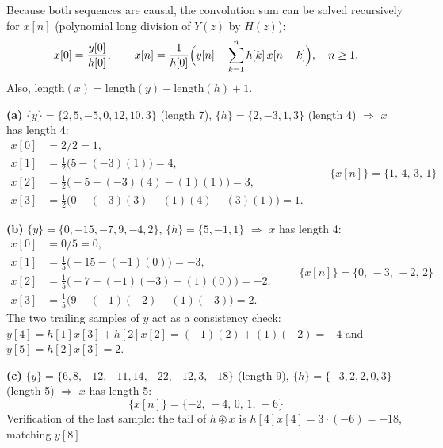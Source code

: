 
Because both sequences are causal, the convolution sum can be solved recursively for
$x[n]$ (polynomial long division of $Y(z)$ by $H(z)$):
\[
x[0]=\frac{y[0]}{h[0]},\qquad
x[n]=\frac{1}{h[0]}\Bigl(y[n]-\sum_{k=1}^{n}h[k]\,x[n-k]\Bigr),\quad n\ge 1 .
\]
Also, $\text{length}(x)=\text{length}(y)-\text{length}(h)+1$.

\textbf{(a)} $\{y\}=\{2,5,-5,0,12,10,3\}$ (length 7), $\{h\}=\{2,-3,1,3\}$ (length 4)
$\Rightarrow$ $x$ has length 4:
\[
\begin{aligned}
x[0]&=2/2=1,\\
x[1]&=\tfrac12\bigl(5-(-3)(1)\bigr)=4,\\
x[2]&=\tfrac12\bigl(-5-(-3)(4)-(1)(1)\bigr)=3,\\
x[3]&=\tfrac12\bigl(0-(-3)(3)-(1)(4)-(3)(1)\bigr)=1 .
\end{aligned}
\qquad
\boxed{\{x[n]\}=\{1,\,4,\,3,\,1\}}
\]

\textbf{(b)} $\{y\}=\{0,-15,-7,9,-4,2\}$, $\{h\}=\{5,-1,1\}$ $\Rightarrow$ $x$ has length 4:
\[
\begin{aligned}
x[0]&=0/5=0,\\
x[1]&=\tfrac15\bigl(-15-(-1)(0)\bigr)=-3,\\
x[2]&=\tfrac15\bigl(-7-(-1)(-3)-(1)(0)\bigr)=-2,\\
x[3]&=\tfrac15\bigl(9-(-1)(-2)-(1)(-3)\bigr)=2 .
\end{aligned}
\qquad
\boxed{\{x[n]\}=\{0,\,-3,\,-2,\,2\}}
\]
The two trailing samples of $y$ act as a consistency check:
$y[4]=h[1]x[3]+h[2]x[2]=(-1)(2)+(1)(-2)=-4$ and $y[5]=h[2]x[3]=2$. \checkmark

\textbf{(c)} $\{y\}=\{6,8,-12,-11,14,-22,-12,3,-18\}$ (length 9), $\{h\}=\{-3,2,2,0,3\}$
(length 5) $\Rightarrow$ $x$ has length 5:
\[
\boxed{\{x[n]\}=\{-2,\,-4,\,0,\,1,\,-6\}}
\]
Verification of the last sample: the tail of $h\circledast x$ is $h[4]x[4]=3\cdot(-6)=-18$,
matching $y[8]$.
